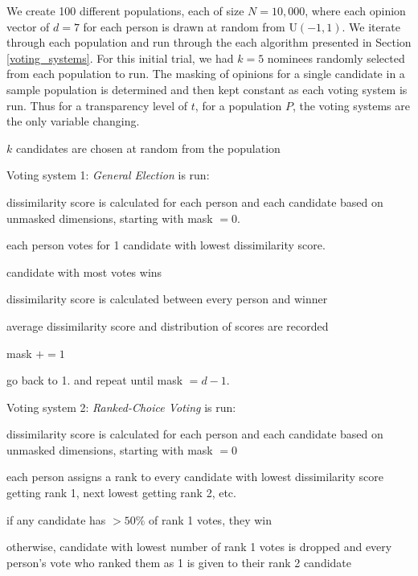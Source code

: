 
We create 100 different populations, each of size $N = 10,000$, where each opinion vector of $d=7$ for each person is drawn at random from U$(-1,1)$.
We iterate through each population and run through the each algorithm presented in Section \ref{voting_systems}.
For this initial trial, we had $k=5$ nominees randomly selected from each population to run.
The masking of opinions for a single candidate in a sample population is determined and then kept constant as each voting system is run.
Thus for a transparency level of $t$, for a population $P$, the voting systems are the only variable changing.

\begin{enum_tight}
\item $k$ candidates are chosen at random from the population
\item Voting system 1: {\it General Election} is run:
\begin{enum_tight}
\item dissimilarity score is calculated for each person and each candidate based on unmasked dimensions, starting with mask $=0$.
\item each person votes for 1 candidate with lowest dissimilarity score.
\item candidate with most votes wins
\item dissimilarity score is calculated between every person and winner
\item average dissimilarity score and distribution of scores are recorded
\item mask $+= 1$
\item go back to 1. and repeat until mask $= d-1$.
\end{enum_tight}
\item Voting system 2: {\it Ranked-Choice Voting} is run:
\begin{enum_tight}
\item dissimilarity score is calculated for each person and each candidate based on unmasked dimensions, starting with mask $=0$
\item each person assigns a rank to every candidate with lowest dissimilarity score getting rank 1, next lowest getting rank 2, etc.
\begin{enum_tight}
\item if any candidate has $> 50\%$ of rank 1 votes, they win
\item otherwise, candidate with lowest number of rank 1 votes is dropped and every person's vote who ranked them as 1 is given to their rank 2 candidate

\end{enum_tight}
\end{enum_tight}
\end{enum_tight}
